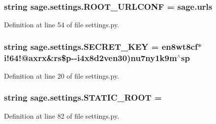 \subsubsection[{R\+O\+O\+T\+\_\+\+U\+R\+L\+C\+O\+N\+F}]{\setlength{\rightskip}{0pt plus 5cm}string sage.\+settings.\+R\+O\+O\+T\+\_\+\+U\+R\+L\+C\+O\+N\+F = \textquotesingle{}sage.\+urls\textquotesingle{}}\label{namespacesage_1_1settings_a92b3d804acae3871a9877ad143df4201}


Definition at line 54 of file settings.\+py.

\hypertarget{namespacesage_1_1settings_acc7cb44e3d92fc1334c19318ede49bc8}{}
\subsubsection[{S\+E\+C\+R\+E\+T\+\_\+\+K\+E\+Y}]{\setlength{\rightskip}{0pt plus 5cm}string sage.\+settings.\+S\+E\+C\+R\+E\+T\+\_\+\+K\+E\+Y = \textquotesingle{}en8wt8cf$\ast$i!64!@axrx\&rs\$p-\/-\/i4x8d2ven30)nu7ny1k9m$^\wedge$sp\textquotesingle{}}\label{namespacesage_1_1settings_acc7cb44e3d92fc1334c19318ede49bc8}


Definition at line 20 of file settings.\+py.

\hypertarget{namespacesage_1_1settings_a91b967847aecdd4d0edfbb0229656929}{}
\subsubsection[{S\+T\+A\+T\+I\+C\+\_\+\+R\+O\+O\+T}]{\setlength{\rightskip}{0pt plus 5cm}string sage.\+settings.\+S\+T\+A\+T\+I\+C\+\_\+\+R\+O\+O\+T = \textquotesingle{}\textquotesingle{}}\label{namespacesage_1_1settings_a91b967847aecdd4d0edfbb0229656929}


Definition at line 82 of file settings.\+py.

\hypertarget{namespacesage_1_1settings_a0b4647cdde23eaed09c255182a9f576c}{}
